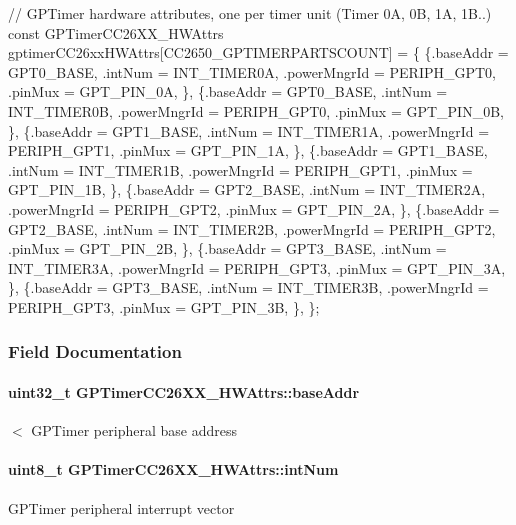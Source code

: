 \begin{DoxyCode}
\textcolor{comment}{// GPTimer hardware attributes, one per timer unit (Timer 0A, 0B, 1A, 1B..)}
\textcolor{keyword}{const} GPTimerCC26XX_HWAttrs gptimerCC26xxHWAttrs[CC2650\_GPTIMERPARTSCOUNT] = \{
  \{.baseAddr = GPT0\_BASE, .intNum = INT\_TIMER0A, .powerMngrId = PERIPH\_GPT0, .pinMux = 
      GPT_PIN_0A, \},
  \{.baseAddr = GPT0\_BASE, .intNum = INT\_TIMER0B, .powerMngrId = PERIPH\_GPT0, .pinMux = 
      GPT_PIN_0B, \},
  \{.baseAddr = GPT1\_BASE, .intNum = INT\_TIMER1A, .powerMngrId = PERIPH\_GPT1, .pinMux = 
      GPT_PIN_1A, \},
  \{.baseAddr = GPT1\_BASE, .intNum = INT\_TIMER1B, .powerMngrId = PERIPH\_GPT1, .pinMux = 
      GPT_PIN_1B, \},
  \{.baseAddr = GPT2\_BASE, .intNum = INT\_TIMER2A, .powerMngrId = PERIPH\_GPT2, .pinMux = 
      GPT_PIN_2A, \},
  \{.baseAddr = GPT2\_BASE, .intNum = INT\_TIMER2B, .powerMngrId = PERIPH\_GPT2, .pinMux = 
      GPT_PIN_2B, \},
  \{.baseAddr = GPT3\_BASE, .intNum = INT\_TIMER3A, .powerMngrId = PERIPH\_GPT3, .pinMux = 
      GPT_PIN_3A, \},
  \{.baseAddr = GPT3\_BASE, .intNum = INT\_TIMER3B, .powerMngrId = PERIPH\_GPT3, .pinMux = 
      GPT_PIN_3B, \},
\};
\end{DoxyCode}
 

\subsubsection{Field Documentation}
\paragraph[{base\+Addr}]{\setlength{\rightskip}{0pt plus 5cm}uint32\+\_\+t G\+P\+Timer\+C\+C26\+X\+X\+\_\+\+H\+W\+Attrs\+::base\+Addr}\label{struct_g_p_timer_c_c26_x_x___h_w_attrs_ad6bc77822c89ec42d268a29178d81828}
$<$ G\+P\+Timer peripheral base address 
\paragraph[{int\+Num}]{\setlength{\rightskip}{0pt plus 5cm}uint8\+\_\+t G\+P\+Timer\+C\+C26\+X\+X\+\_\+\+H\+W\+Attrs\+::int\+Num}\label{struct_g_p_timer_c_c26_x_x___h_w_attrs_af8a6cce8af13c52e964b65ac2f8fa9f3}
G\+P\+Timer peripheral interrupt vector 
